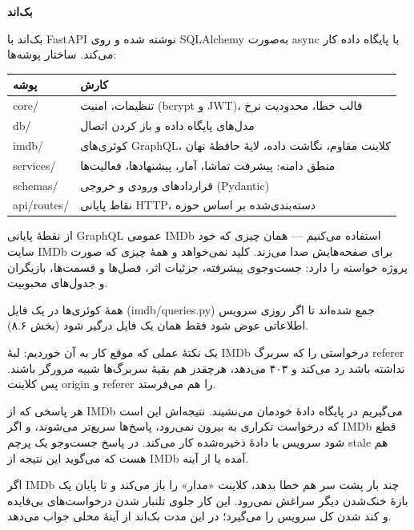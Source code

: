 \documentclass[12pt]{article}
\newcommand{\en}[1]{\textenglish{#1}}
\newcommand{\heading}[1]{%
  \par
  \vskip 0pt plus 7\baselineskip\penalty -100\vskip 0pt plus -7\baselineskip
  \vspace{1.2em}%
  {\Large\bfseries #1}%
  \par\vspace{0.6em}%
  \nobreak
}
\newcommand{\sub}[1]{%
  \par\vspace{0.8em}{\large\bfseries #1}\par\vspace{0.35em}\nobreak
}
\begin{document}
\heading{بک‌اند}

بک‌اند با \en{FastAPI} نوشته شده و روی \en{SQLAlchemy} به‌صورت \en{async} با پایگاه داده کار
می‌کند. ساختار پوشه‌ها:

\begin{center}
\begin{tabular}{|l|p{9.2cm}|}
\hline
\textbf{پوشه} & \textbf{کارش} \\
\hline
\en{core/} & تنظیمات، امنیت (\en{bcrypt} و \en{JWT})، قالب خطا، محدودیت نرخ \\
\hline
\en{db/} & مدل‌های پایگاه داده و باز کردن اتصال \\
\hline
\en{imdb/} & کوئری‌های \en{GraphQL}، کلاینت مقاوم، نگاشت داده، لایهٔ حافظهٔ نهان \\
\hline
\en{services/} & منطق دامنه: پیشرفت تماشا، آمار، پیشنهادها، فعالیت‌ها \\
\hline
\en{schemas/} & قراردادهای ورودی و خروجی (\en{Pydantic}) \\
\hline
\en{api/routes/} & نقاط پایانی \en{HTTP}، دسته‌بندی‌شده بر اساس حوزه \\
\hline
\end{tabular}
\end{center}

\sub{گرفتن داده از \en{IMDb}}

از نقطهٔ پایانی \en{GraphQL} عمومی \en{IMDb} استفاده می‌کنیم — همان چیزی که خود سایت \en{IMDb}
برای صفحه‌هایش صدا می‌زند. کلید نمی‌خواهد و همهٔ چیزی که صورت پروژه خواسته را دارد: جست‌وجوی
پیشرفته، جزئیات اثر، فصل‌ها و قسمت‌ها، بازیگران و جدول‌های محبوبیت.

همهٔ کوئری‌ها در یک فایل (\en{imdb/queries.py}) جمع شده‌اند تا اگر روزی سرویس اطلاعاتی عوض شود
فقط همان یک فایل درگیر شود (بخش \textenglish{۸.۶}).

یک نکتهٔ عملی که موقع کار به آن خوردیم: لبهٔ \en{IMDb} درخواستی را که سربرگ \en{referer} نداشته
باشد رد می‌کند و \en{۴۰۳} می‌دهد، هرچقدر هم بقیهٔ سربرگ‌ها شبیه مرورگر باشند. پس کلاینت
\en{origin} و \en{referer} را هم می‌فرستد.

\sub{آینهٔ محلی و حافظهٔ نهان}

هر پاسخی که از \en{IMDb} می‌گیریم در پایگاه دادهٔ خودمان می‌نشیند. نتیجه‌اش این است که درخواست
تکراری به بیرون نمی‌رود، پاسخ‌ها سریع‌تر می‌شوند، و اگر \en{IMDb} قطع شود سرویس با دادهٔ
ذخیره‌شده کار می‌کند. در پاسخ جست‌وجو یک پرچم \en{stale} هم هست که می‌گوید این نتیجه از
\en{IMDb} آمده یا از آینه.

\sub{مدارشکن}

اگر \en{IMDb} چند بار پشت سر هم خطا بدهد، کلاینت «مدار» را باز می‌کند و تا پایان یک بازهٔ
خنک‌شدن دیگر سراغش نمی‌رود. این کار جلوی تلنبار شدن درخواست‌های بی‌فایده و کند شدن کل سرویس را
می‌گیرد؛ در این مدت بک‌اند از آینهٔ محلی جواب می‌دهد.
\end{document}

